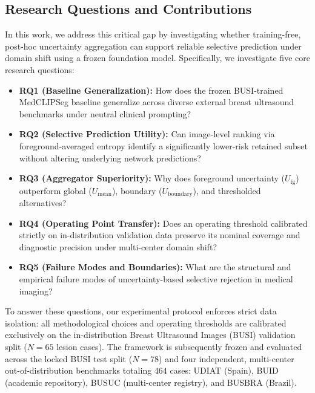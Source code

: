 \documentclass[10pt,journal,compsoc]{IEEEtran}
\begin{document}
\subsection{Research Questions and Contributions}
In this work, we address this critical gap by investigating whether training-free, post-hoc uncertainty aggregation can support reliable selective prediction under domain shift using a frozen foundation model. Specifically, we investigate five core research questions:
\begin{itemize}
    \item \textbf{RQ1 (Baseline Generalization):} How does the frozen BUSI-trained MedCLIPSeg baseline generalize across diverse external breast ultrasound benchmarks under neutral clinical prompting?
    \item \textbf{RQ2 (Selective Prediction Utility):} Can image-level ranking via foreground-averaged entropy identify a significantly lower-risk retained subset without altering underlying network predictions?
    \item \textbf{RQ3 (Aggregator Superiority):} Why does foreground uncertainty ($U_{\mathrm{fg}}$) outperform global ($U_{\mathrm{mean}}$), boundary ($U_{\mathrm{boundary}}$), and thresholded alternatives?
    \item \textbf{RQ4 (Operating Point Transfer):} Does an operating threshold calibrated strictly on in-distribution validation data preserve its nominal coverage and diagnostic precision under multi-center domain shift?
    \item \textbf{RQ5 (Failure Modes and Boundaries):} What are the structural and empirical failure modes of uncertainty-based selective rejection in medical imaging?
\end{itemize}

To answer these questions, our experimental protocol enforces strict data isolation: all methodological choices and operating thresholds are calibrated exclusively on the in-distribution Breast Ultrasound Images (BUSI) validation split ($N=65$ lesion cases). The framework is subsequently frozen and evaluated across the locked BUSI test split ($N=78$) and four independent, multi-center out-of-distribution benchmarks totaling $464$ cases: UDIAT (Spain), BUID (academic repository), BUSUC (multi-center registry), and BUSBRA (Brazil).
\end{document}
